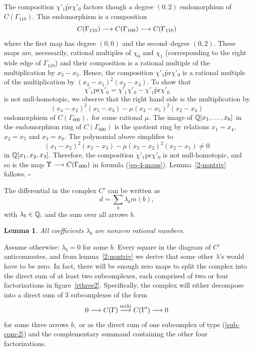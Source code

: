 \documentclass[12pt]{article}
\newtheorem{lemma}{Lemma}
\begin{document}
The composition $\chi'_1\widetilde{\mathrm{pr}} \chi'_0$ factors though a 
degree $(0,2)$ endomorphism of $C(\Gamma_{110}).$ This endomorphism 
is a composition 
$$ C(\Gamma_{110}) \longrightarrow C(\Gamma_{100}) \longrightarrow C(\Gamma_{110})$$ 
where the first map has degree $(0,0)$ and the second--degree $(0,2).$ These 
maps are, necessarily, rational multiples of $\chi_0$ and $\chi_1$ (corresponding 
to the right wide edge of $\Gamma_{110}$) and their composition  is 
a rational multiple of the multiplication by $x_3-x_5.$ Hence, the composition 
$\chi'_1\widetilde{\mathrm{pr}} \chi'_0$ is a rational multiple of the multiplication 
by $(x_3-x_5)^2 (x_2-x_4).$ To show that 
$$\chi'_1\mathrm{pr} \chi'_0=\chi'_1\chi'_0 - \chi'_1\widetilde{\mathrm{pr}}\chi'_0$$
is not null-homotopic, we observe that the right hand side is the multiplication by 
$$(x_4-x_2)^2(x_5-x_3) - \mu (x_3-x_5)^2 (x_2-x_4)$$
endomorphism of $C(\Gamma_{000}),$ for some rational $\mu.$ The image of 
$\mathbb Q[x_1, \dots, x_6]$ in the 
endomorphism ring of $C(\Gamma_{000})$ is the quotient ring by relations 
$x_1=x_4,$ $x_2=x_5$ and $x_3=x_6.$ The polynomial above simplifies to 
$$ (x_1-x_2)^2 (x_2-x_3) - \mu (x_3-x_2)^2 (x_2-x_1) \not= 0 $$ 
in $\mathbb Q[x_1, x_2, x_3].$ Therefore, the composition   
$\chi'_1\mathrm{pr} \chi'_0$ is not null-homotopic, and so is the map 
$\Upsilon\longrightarrow C(\Gamma_{000})$ in formula (\ref{eq-4-maps}). 
Lemma~\ref{2-nontriv} follows. $\square$ 

\vspace{0.15in} 

The differential in the complex $C'$ can be written as 
$$ d= \sum_b  \lambda_b  m(b), $$
with $\lambda_b\in \mathbb Q,$ and  the sum over all arrows $b.$   

\begin{lemma}\label{all-nonzero} All coefficients $\lambda_b$ 
are nonzero rational numbers.  \end{lemma} 

Assume otherwise: $\lambda_b=0$ for some $b.$ Every square in 
the diagram of $C'$ anticommutes, and from lemma~\ref{2-nontriv} 
we derive that some other $\lambda$'s would have to be zero. 
In fact, there will be enough zero maps to split the complex 
into the direct sum of at least two subcomplexes, each comprised 
of two or four factorizations in figure~\ref{rthree2}.
Specifically, the complex will either decompose into a direct sum 
of 3 subcomplexes  of the form 
\begin{equation} \label{sub-com-2}  
0 \longrightarrow C(\Gamma) \stackrel{m(b)}{\longrightarrow} C(\Gamma') \longrightarrow 0
\end{equation}  
for some three arrows $b,$ or as the direct sum of one subcomplex 
of type (\ref{sub-com-2}) and the complementary summand containing 
the other four factorizations. 
\end{document}

